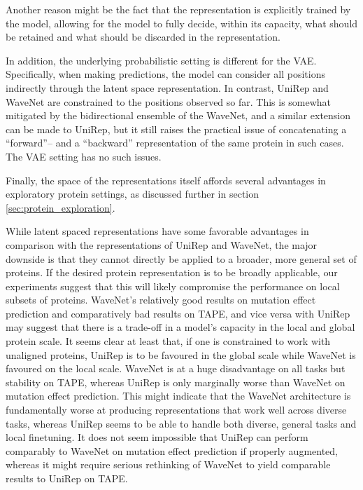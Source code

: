 Another reason might be the fact that the representation is explicitly trained by the model, allowing for the model to fully decide, within its capacity, what should be retained and what should be discarded in the representation. 

In addition, the underlying probabilistic setting is different for the VAE. Specifically, when making predictions, the model can consider all positions indirectly through the latent space representation. In contrast, UniRep and WaveNet are constrained to the positions observed so far. This is somewhat mitigated by the bidirectional ensemble of the WaveNet, and a similar extension can be made to UniRep, but it still raises the practical issue of concatenating a ``forward''-- and a ``backward'' representation of the same protein in such cases. The VAE setting has no such issues.

Finally, the space of the representations itself affords several advantages in exploratory protein settings, as discussed further in section \ref{sec:protein_exploration}.

While latent spaced representations have some favorable advantages in comparison with the representations of UniRep and WaveNet, the major downside is that they cannot directly be applied to a broader, more general set of proteins. If the desired protein representation is to be broadly applicable, our experiments suggest that this will likely compromise the performance on local subsets of proteins. WaveNet's relatively good results on mutation effect prediction and comparatively bad results on TAPE, and vice versa with UniRep may suggest that there is a trade-off in a model's capacity in the local and global protein scale. It seems clear at least that, if one is constrained to work with unaligned proteins, UniRep is to be favoured in the global scale while WaveNet is favoured on the local scale. WaveNet is at a huge disadvantage on all tasks but stability on TAPE, whereas UniRep is only marginally worse than WaveNet on mutation effect prediction. This might indicate that the WaveNet architecture is fundamentally worse at producing representations that work well across diverse tasks, whereas UniRep seems to be able to handle both diverse, general tasks and local finetuning. It does not seem impossible that UniRep can perform comparably to WaveNet on mutation effect prediction if properly augmented, whereas it might require serious rethinking of WaveNet to yield comparable results to UniRep on TAPE.

